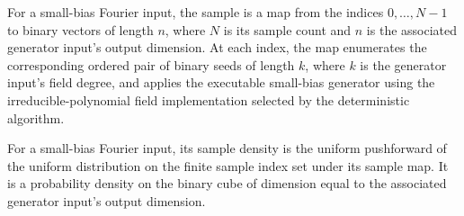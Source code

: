 \begin{definition}
\label{FABL.SmallBiasFourierInput.sample}
\leanok
{}
For a small-bias Fourier input, the sample is a map from the indices $0,\ldots,N-1$ to
binary vectors of length $n$, where $N$ is its sample count and $n$ is the associated
generator input's output dimension. At each index, the map enumerates the corresponding
ordered pair of binary seeds of length $k$, where $k$ is the generator input's field
degree, and applies the executable small-bias generator using the irreducible-polynomial
field implementation selected by the deterministic algorithm.
\end{definition}

\begin{definition}
\label{FABL.SmallBiasFourierInput.sampleDensity}
\leanok
{}
For a small-bias Fourier input, its sample density is the uniform pushforward of the
uniform distribution on the finite sample index set under its sample map. It is a
probability density on the binary cube of dimension equal to the associated generator
input's output dimension.
\end{definition}

